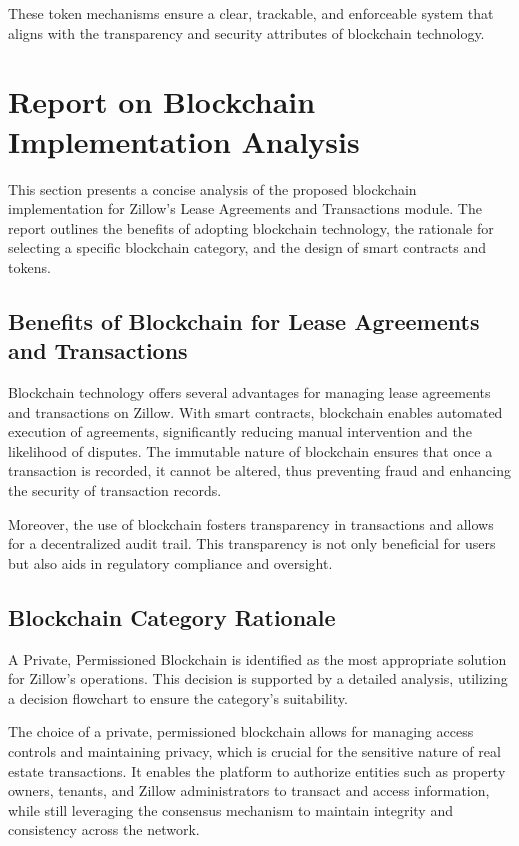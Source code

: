\documentclass{article}
\begin{document}
These token mechanisms ensure a clear, trackable, and enforceable system that aligns with the transparency and security attributes of blockchain technology.

\section{Report on Blockchain Implementation Analysis}

This section presents a concise analysis of the proposed blockchain implementation for Zillow's Lease Agreements and Transactions module. The report outlines the benefits of adopting blockchain technology, the rationale for selecting a specific blockchain category, and the design of smart contracts and tokens.

\subsection{Benefits of Blockchain for Lease Agreements and Transactions}
Blockchain technology offers several advantages for managing lease agreements and transactions on Zillow. With smart contracts, blockchain enables automated execution of agreements, significantly reducing manual intervention and the likelihood of disputes. The immutable nature of blockchain ensures that once a transaction is recorded, it cannot be altered, thus preventing fraud and enhancing the security of transaction records. 

Moreover, the use of blockchain fosters transparency in transactions and allows for a decentralized audit trail. This transparency is not only beneficial for users but also aids in regulatory compliance and oversight. 

\subsection{Blockchain Category Rationale}
A Private, Permissioned Blockchain is identified as the most appropriate solution for Zillow's operations. This decision is supported by a detailed analysis, utilizing a decision flowchart to ensure the category's suitability. 

The choice of a private, permissioned blockchain allows for managing access controls and maintaining privacy, which is crucial for the sensitive nature of real estate transactions. It enables the platform to authorize entities such as property owners, tenants, and Zillow administrators to transact and access information, while still leveraging the consensus mechanism to maintain integrity and consistency across the network.
\end{document}
